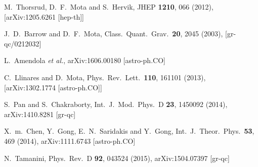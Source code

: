 \documentclass[superscriptaddress,oneolumn,secnumarabic,
amssymb,amsmath,nobibnotes,aps,prd,showpacs,nofootinbib]{revtex4}%
\begin{document}
\begin{thebibliography}{*}
  M.~Thorsrud, D.~F.~Mota and S.~Hervik,
  JHEP {\bf 1210}, 066 (2012),
  [arXiv:1205.6261 [hep-th]]


  J.~D.~Barrow and D.~F.~Mota,
  Class.\ Quant.\ Grav.\  {\bf 20}, 2045 (2003),
  [gr-qc/0212032]

  L.~Amendola {\it et al.},
  arXiv:1606.00180 [astro-ph.CO]

  C.~Llinares and D.~Mota,
  Phys.\ Rev.\ Lett.\  {\bf 110}, 161101 (2013),
  [arXiv:1302.1774 [astro-ph.CO]]


  S.~Pan and S.~Chakraborty,
  Int.\ J.\ Mod.\ Phys.\ D {\bf 23}, 1450092 (2014),
  arXiv:1410.8281 [gr-qc]


  X.~m.~Chen, Y.~Gong, E.~N.~Saridakis and Y.~Gong,
  Int.\ J.\ Theor.\ Phys.\  {\bf 53}, 469 (2014),
  arXiv:1111.6743 [astro-ph.CO]


  N.~Tamanini,
  Phys.\ Rev.\ D {\bf 92}, 043524 (2015),
  arXiv:1504.07397 [gr-qc]




\end{thebibliography}
\end{document}

